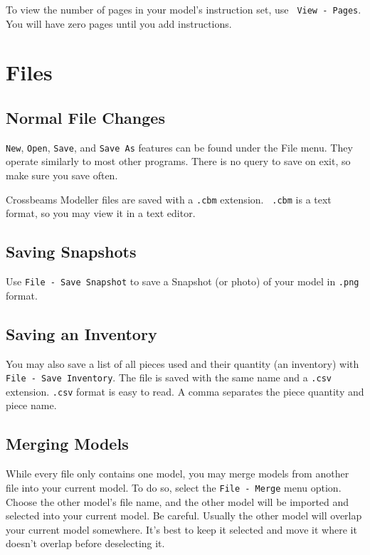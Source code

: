 \documentclass[12pt]{report}
\begin{document}
To view the number of pages in your model's instruction set, use {\tt
  View - Pages}.  You will have zero pages until you add instructions.

\section{Files}

\subsection{Normal File Changes}

{\tt New}, {\tt Open}, {\tt Save}, and {\tt Save As} features can be
found under the File menu.  They operate similarly to most other
programs.  There is no query to save on exit, so make sure you save
often.

Crossbeams Modeller files are saved with a {\tt .cbm} extension.  {\tt
  .cbm} is a text format, so you may view it in a text editor.

\subsection{Saving Snapshots}

Use {\tt File - Save Snapshot} to save a Snapshot (or photo) of your
model in {\tt .png} format.

\subsection{Saving an Inventory}

You may also save a list of all pieces used and their quantity (an
inventory) with {\tt File - Save Inventory}.  The file is saved with
the same name and a {\tt .csv} extension.  {\tt .csv} format is easy
to read.  A comma separates the piece quantity and piece name.

\subsection{Merging Models}

While every file only contains one model, you may merge models from
another file into your current model.  To do so, select the {\tt File
  - Merge} menu option.  Choose the other model's file name, and the
other model will be imported and selected into your current model.  Be
careful.  Usually the other model will overlap your current model
somewhere.  It's best to keep it selected and move it where it doesn't
overlap before deselecting it.
\end{document}
